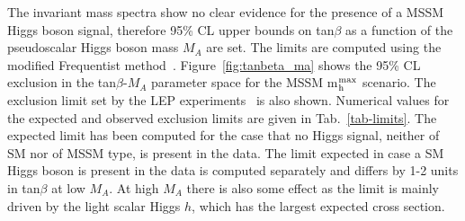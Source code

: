 The invariant mass spectra show no clear evidence for the presence of a MSSM Higgs boson signal, 
therefore 95\% CL upper bounds on tan$\beta$ as a function of the pseudoscalar Higgs boson mass $M_A$ are set.
The limits are computed using the modified Frequentist method~\cite{Read}.
Figure~\ref{fig:tanbeta_ma} shows the 95\% CL exclusion in the tan$\beta$-$M_{A}$ parameter space for the MSSM m$_{\rm h}^{\rm max}$ scenario. 
The exclusion limit set by the LEP experiments~\cite{LEP2-MSSM} is also shown.
Numerical values for the expected and observed exclusion limits are given in Tab.~\ref{tab-limits}. 
The expected limit has been computed for the case that no Higgs signal, neither of SM nor of MSSM type, is present in the data.
The limit expected in case a SM Higgs boson is present in the data is computed separately 
and differs by 1-2 units in tan$\beta$ at low $M_{A}$.
At high $M_{A}$ there is also some effect as the limit is mainly
driven by the light scalar Higgs $h$, which has the largest expected cross section.







